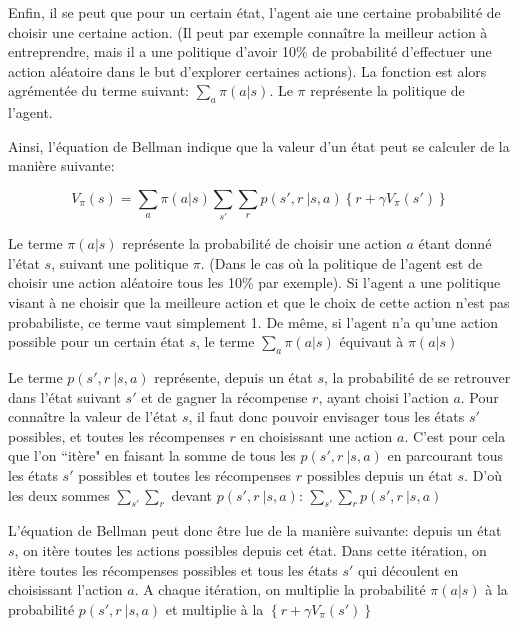 \documentclass[11pt,a4paper]{report}
\begin{document}
    \par Enfin, il se peut que pour un certain état, l'agent aie une certaine probabilité de choisir une certaine action. (Il peut par exemple connaître la meilleur action à entreprendre, mais il a une politique d'avoir 10\% de probabilité d'effectuer une action aléatoire dans le but d'explorer certaines actions). La fonction est alors agrémentée du terme suivant: $\sum_a\pi(a|s)$. Le $\pi$ représente la politique de l'agent.
    
    \par Ainsi, l'équation de Bellman indique que la valeur d'un état peut se calculer de la manière suivante: 
    
    $$V_\pi(s) = \sum_a\pi(a|s)\sum_{s'}\sum_rp(s',r\ |s,a)\left\{r+\gamma V_\pi(s')\right\}$$
    
    \par Le terme $\pi(a|s)$ représente la probabilité de choisir une action $a$ étant donné l'état $s$, suivant une politique $\pi$. (Dans le cas où la politique de l'agent est de choisir une action aléatoire tous les 10\% par exemple). Si l'agent a une politique visant à ne choisir que la meilleure action et que le choix de cette action n'est pas probabiliste, ce terme vaut simplement 1. De même, si l'agent n'a qu'une action possible pour un certain état $s$, le terme $\sum_a\pi(a|s)$ équivaut à $\pi(a|s)$
    
    \par Le terme $p(s',r\ |s,a)$ représente, depuis un état $s$, la probabilité de se retrouver dans l'état suivant $s'$ et de gagner la récompense $r$, ayant choisi l'action $a$. Pour connaître la valeur de l'état $s$, il faut donc pouvoir envisager tous les états $s'$ possibles, et toutes les récompenses $r$ en choisissant une action $a$. C'est pour cela que l'on ``itère" en faisant la somme de tous les $p(s',r\ |s,a)$ en parcourant tous les états $s'$ possibles et toutes les récompenses $r$ possibles depuis un état $s$. D'où les deux sommes $\sum_{s'}\sum_r$ devant $p(s',r\ |s,a)$:  $\sum_{s'}\sum_rp(s',r\ |s,a)$
    
    \par L'équation de Bellman peut donc être lue de la manière suivante: depuis un état $s$, on itère toutes les actions possibles depuis cet état. Dans cette itération, on itère toutes les récompenses possibles et tous les états $s'$ qui découlent en choisissant l'action $a$. A chaque itération, on multiplie la probabilité $\pi(a|s)$ à la probabilité $p(s',r\ |s,a)$ et multiplie à la $\left\{r+\gamma V_\pi(s')\right\}$
    
\end{document}
